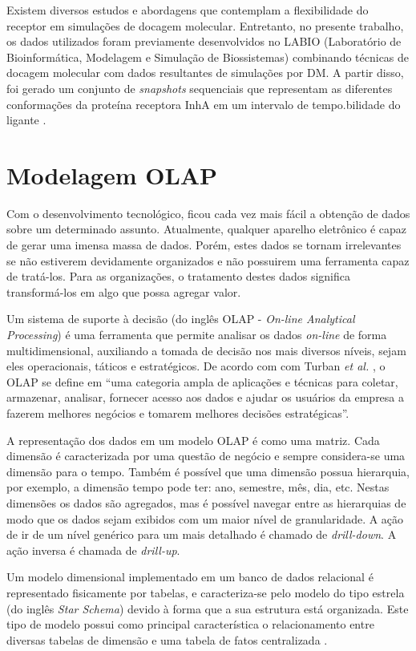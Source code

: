 Existem diversos estudos e abordagens que contemplam a flexibilidade do receptor em simulações de docagem molecular. Entretanto, no presente trabalho, os dados utilizados foram previamente desenvolvidos no LABIO (Laboratório de Bioinformática, Modelagem e Simulação de Biossistemas) combinando técnicas de docagem molecular com dados resultantes de simulações por DM. A partir disso, foi gerado um conjunto de \emph{snapshots} sequenciais que representam as diferentes conformações da proteína receptora InhA em um intervalo de tempo.bilidade do ligante \cite{kar11}.

\section{Modelagem OLAP}

Com o desenvolvimento tecnológico, ficou cada vez mais fácil a obtenção de dados sobre um determinado assunto. Atualmente, qualquer aparelho eletrônico é capaz de gerar uma imensa massa de dados. Porém, estes dados se tornam irrelevantes se não estiverem devidamente organizados e não possuirem uma ferramenta capaz de tratá-los. Para as organizações, o tratamento destes dados significa transformá-los em algo que possa agregar valor.

Um sistema de suporte à decisão (do inglês OLAP - \emph{On-line Analytical Processing}) é uma ferramenta que permite analisar os dados \emph{on-line} de forma multidimensional, auxiliando a tomada de decisão nos mais diversos níveis, sejam eles operacionais, táticos e estratégicos. De acordo com com Turban \emph{et al.} \cite{TUR05}, o OLAP se define em “uma categoria ampla de aplicações e técnicas para coletar, armazenar, analisar, fornecer acesso aos dados e ajudar os usuários da empresa a fazerem melhores negócios e tomarem melhores decisões estratégicas”. 

A representação dos dados em um modelo OLAP é como uma matriz. Cada dimensão é caracterizada por uma questão de negócio e sempre considera-se uma dimensão para o tempo. Também é possível que uma dimensão possua hierarquia, por exemplo, a dimensão tempo pode ter: ano, semestre, mês, dia, etc. Nestas dimensões os dados são agregados, mas é possível navegar entre as hierarquias de modo que os dados sejam exibidos com um maior nível de granularidade. A ação de ir de um nível genérico para um mais detalhado é chamado de \emph{drill-down}. A ação inversa é chamada de \emph{drill-up}.

Um modelo dimensional implementado em um banco de dados relacional é representado fisicamente por tabelas, e caracteriza-se pelo modelo do tipo estrela (do inglês \emph{Star Schema}) devido à forma que a sua estrutura está organizada. Este tipo de modelo possui como principal característica o relacionamento entre diversas tabelas de dimensão e uma tabela de fatos centralizada \cite{KIM13}.


